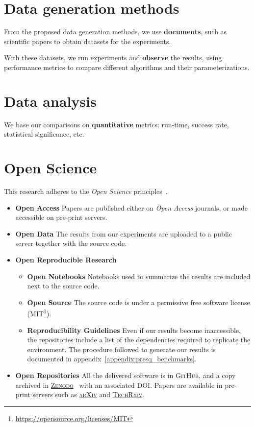 

\section{Data generation methods}
From the proposed data generation methods, we use \textbf{documents},
such as scientific papers to obtain datasets for the experiments.

With these datasets, we run experiments and \textbf{observe} the results,
using performance metrics to compare different algorithms and their parameterizations.

\section{Data analysis}
We base our comparisons on \textbf{quantitative} metrics: run-time, success rate,
statistical significance, etc.

\section{Open Science}
This research adheres to the \emph{Open Science} principles~\cite{oro44719}.

\begin{itemize}
    \item \textbf{Open Access} Papers are published either on \emph{Open Access} journals,
        or made accessible on pre-print servers.
    \item \textbf{Open Data} The results from our experiments are uploaded to a public server together with the source code.
    \item \textbf{Open Reproducible Research} 
        \begin{itemize}
            \item \textbf{Open Notebooks} Notebooks used to summarize the results are
                included next to the source code.
            \item \textbf{Open Source} The source code is under a permissive free software license
                (MIT\footnote{\url{https://opensource.org/licenses/MIT}}).
            \item \textbf{Reproducibility Guidelines} Even if our results become
            inaccessible, the repositories include a list of the dependencies required to replicate the environment. 
            The procedure followed to generate our results is documented in appendix~\ref{appendix:presq_benchmarks}.
        \end{itemize}
    \item \textbf{Open Repositories} All the delivered software is in \textsc{GitHub},
        and a copy archived in \href{https://zenodo.org/}{\textsc{Zenodo}}~\cite{zenodo} with an
        associated DOI. Papers are available in pre-print servers such as
        \href{https://arxiv.org/}{\textsc{arXiv}} and
        \href{https://www.techrxiv.org}{\textsc{TechRxiv}}.
\end{itemize}
